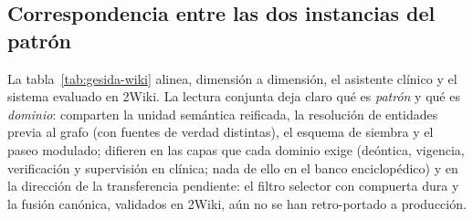 \documentclass[11pt,a4paper]{article}
\begin{document}
\subsection{Correspondencia entre las dos instancias del patrón}

La tabla~\ref{tab:gesida-wiki} alinea, dimensión a dimensión, el asistente
clínico y el sistema evaluado en 2Wiki. La lectura conjunta deja claro qué
es \emph{patrón} y qué es \emph{dominio}: comparten la unidad semántica
reificada, la resolución de entidades previa al grafo (con fuentes de
verdad distintas), el esquema de siembra y el paseo modulado; difieren en
las capas que cada dominio exige (deóntica, vigencia, verificación y
supervisión en clínica; nada de ello en el banco enciclopédico) y en la
dirección de la transferencia pendiente: el filtro selector con compuerta
dura y la fusión canónica, validados en 2Wiki, aún no se han retro-portado
a producción.
\end{document}
